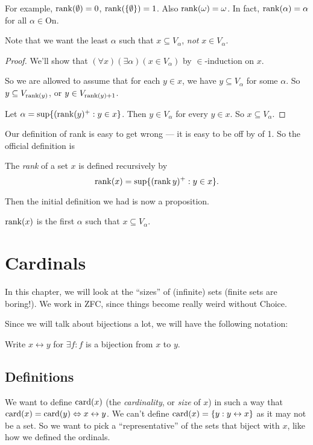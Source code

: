 \documentclass[a4paper]{article}
\begin{document}
For example, $\operatorname{rank}(\emptyset) = 0$, $\operatorname{rank}(\{\emptyset\}) = 1$. Also $\operatorname{rank}(\omega) = \omega$. In fact, $\operatorname{rank}(\alpha) = \alpha$ for all $\alpha\in \mathrm{On}$.

Note that we want the least $\alpha$ such that $x\subseteq V_\alpha$, \emph{not} $x\in V_\alpha$.

\begin{proof}
  We'll show that $(\forall x)(\exists \alpha)(x\in V_\alpha)$ by $\in$-induction on $x$.

  So we are allowed to assume that for each $y\in x$, we have $y\subseteq V_\alpha$ for some $\alpha$. So $y\subseteq V_{\operatorname{rank}(y)}$, or $y\in V_{\operatorname{rank}(y) + 1}$.

  Let $\alpha = \sup\{(\operatorname{rank}(y)^+: y\in x\}$. Then $y\in V_\alpha$ for every $y\in x$. So $x\subseteq V_\alpha$.
\end{proof}

Our definition of rank is easy to get wrong --- it is easy to be off by of 1. So the official definition is
\begin{defi}[Rank]
  The \emph{rank} of a set $x$ is defined recursively by
  \[
    \operatorname{rank}(x) = \sup\{(\operatorname{rank} y)^+ : y\in x\}.
  \]
\end{defi}

Then the initial definition we had is now a proposition.
\begin{prop}
  $\operatorname{rank}(x)$ is the first $\alpha$ such that $x\subseteq V_\alpha$.
\end{prop}

\section{Cardinals}
In this chapter, we will look at the ``sizes'' of (infinite) sets (finite sets are boring!). We work in ZFC, since things become really weird without Choice.

Since we will talk about bijections a lot, we will have the following notation:
\begin{notation}
  Write $x\leftrightarrow y$ for $\exists f: f$ is a bijection from $x$ to $y$.
\end{notation}

\subsection{Definitions}
We want to define $\operatorname{card}(x)$ (the \emph{cardinality}, or \emph{size} of $x$) in such a way that $\operatorname{card}(x) = \operatorname{card}(y) \Leftrightarrow x\leftrightarrow y$. We can't define $\operatorname{card}(x) = \{y: y\leftrightarrow x\}$ as it may not be a set. So we want to pick a ``representative'' of the sets that biject with $x$, like how we defined the ordinals.
\end{document}
